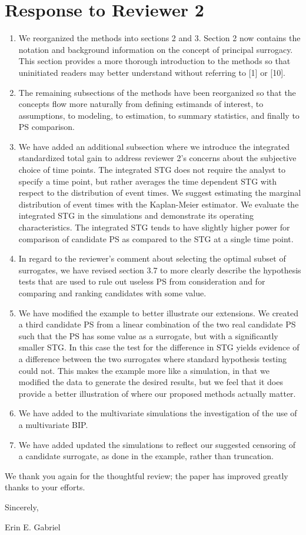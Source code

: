 \documentclass[11pt]{article} %
\begin{document}
\section{Response to Reviewer 2}
\begin{enumerate}
\item We reorganized the methods into sections 2 and 3. Section 2 now contains the notation and background information on the concept of principal surrogacy. This section provides a more thorough introduction to the methods so that uninitiated readers may better understand without referring to [1] or [10]. 
\item The remaining subsections of the methods have been reorganized so that the concepts flow more naturally from defining estimands of interest, to assumptions, to modeling, to estimation, to summary statistics, and finally to PS comparison. 
\item We have added an additional subsection where we introduce the integrated standardized total gain to address reviewer 2's concerns about the subjective choice of time points.  The integrated STG does not require the analyst to specify a time point, but rather averages the time dependent STG with respect to the distribution of event times. We suggest estimating the marginal distribution of event times with the Kaplan-Meier estimator. We evaluate the integrated STG in the simulations and demonstrate its operating characteristics. The integrated STG tends to have slightly higher power for comparison of candidate PS as compared to the STG at a single time point. 
\item In regard to the reviewer's comment about selecting the optimal subset of surrogates, we have revised section 3.7 to more clearly describe the hypothesis tests that are used to rule out useless PS from consideration and for comparing and ranking candidates with some value. 
\item We have modified the example to better illustrate our extensions. We created a third candidate PS from a linear combination of the two real candidate PS such that the PS has some value as a surrogate, but with a significantly smaller STG. In this case the test for the difference in STG yields evidence of a difference between the two surrogates where standard hypothesis testing could not. This makes the example more like a simulation, in that we modified the data to generate the desired results, but we feel that it does provide a better illustration of where our proposed methods actually matter. 
\item We have added to the multivariate simulations the investigation of the use of a multivariate BIP. 
\item We have added updated the simulations to reflect our suggested censoring of a candidate surrogate, as done in the example, rather than truncation. 
\end{enumerate}

We thank you again for the thoughtful review; the paper has improved greatly thanks to your efforts. 

\vspace{2em}

\hfill{Sincerely,}
\vspace{2em}

\hfill{Erin E. Gabriel}
\end{document}
